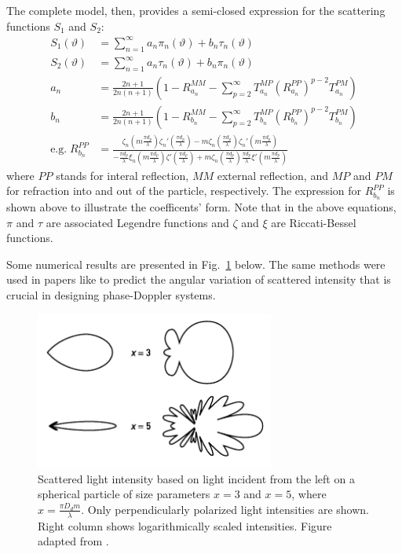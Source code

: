 \documentclass[11.5pt,oneside]{book}
\newcommand*{\figref}[1]{Fig.~\ref{#1}}
\begin{document}
The complete model, then, provides a semi-closed expression for the scattering
functions $S_1$ and $S_2$:
   \begin{align}
      S_1(\vartheta) &= \sum_{n=1}^{\infty} a_n\pi_n(\vartheta) +
      b_n\tau_n(\vartheta) \\
      S_2(\vartheta) &= \sum_{n=1}^{\infty} a_n\tau_n(\vartheta) +
      b_n\pi_n(\vartheta) \\
      a_n &= \frac{2n+1}{2n(n+1)} (1-R^{MM}_{a_n} - \sum_{p=2}^{\infty}
      T_{a_n}^{MP} (R_{a_n}^{PP})^{p-2} T_{a_n}^{PM}) \\
      b_n &= \frac{2n+1}{2n(n+1)} (1-R^{MM}_{b_n} - \sum_{p=2}^{\infty}
      T_{b_n}^{MP} (R_{b_n}^{PP})^{p-2} T_{b_n}^{PM}) \\
      \mathrm{e.g.\;} R_{b_n}^{PP} &= \frac{\zeta_n(m \frac{\pi
      d_p}{\lambda})\zeta_n'(\frac{\pi d_p}{\lambda}) -
      m\zeta_n(\frac{\pi d_p}{\lambda})\zeta_n'(m \frac{\pi
      d_p}{\lambda})}{-\frac{\pi d_p}{\lambda}\xi_n(m \frac{\pi
      d_p}{\lambda})\zeta'(\frac{\pi d_p}{\lambda}) + m\zeta_n(\frac{\pi
      d_p}{\lambda})\frac{\pi d_p}{\lambda}\xi'(m \frac{\pi
      d_p}{\lambda})}
    \end{align}
where $PP$ stands for interal reflection, $MM$ external reflection, and $MP$
and $PM$ for refraction into and out of the particle, respectively. The
expression for $R_{b_n}^{PP}$ is shown above to illustrate the coefficents'
form. Note that in the above equations, $\pi$ and $\tau$ are associated Legendre functions and $\zeta$ and $\xi$ are Riccati-Bessel functions.

Some numerical results are presented in \figref{fig:angleresults} below. The
same methods were used in papers like \citet{Naqwi96} to predict the angular
variation of scattered intensity that is crucial in designing phase-Doppler
systems.

\begin{figure}
    \centering
    \includegraphics[width=0.7\textwidth]{img/scattering/results.pdf}
    \caption{Scattered light intensity based on light incident from the left on a spherical particle of size parameters $x=3$ and $x=5$, where $x = \frac{\pi D_d m}{\lambda}$. Only perpendicularly polarized light intensities are shown. Right column shows logarithmically scaled intensities. Figure adapted from \citet{Albrecht03}.}
    \label{fig:angleresults}
\end{figure}
\end{document}
